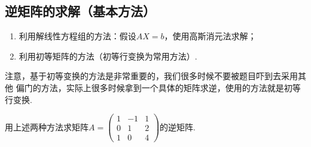 \subsection{逆矩阵的求解（基本方法）}
\begin{enumerate}
    \item 利用解线性方程组的方法：假设$AX=b$，使用高斯消元法求解；

    \item 利用初等矩阵的方法（初等行变换为常用方法）.
\end{enumerate}

注意，基于初等变换的方法是非常重要的，我们很多时候不要被题目吓到去采用其他
偏门的方法，实际上很多时候拿到一个具体的矩阵求逆，使用的方法就是初等行变换.

\begin{example}
    用上述两种方法求矩阵$A=\begin{pmatrix}1 & -1 & 1 \\ 0 & 1 & 2 \\ 1 & 0 & 4\end{pmatrix}$的逆矩阵.
\end{example}

